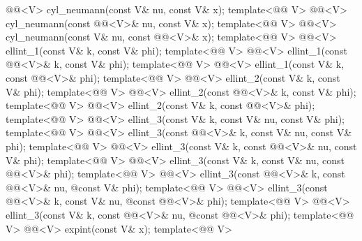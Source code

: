\begin{codeblock}
{    @@<V> cyl_neumann(const V& nu, const V& x);
  template<@@ V>
    @@<V> cyl_neumann(const @@<V>& nu, const V& x);
  template<@@ V>
    @@<V> cyl_neumann(const V& nu, const @@<V>& x);
  template<@@ V>
    @@<V> ellint_1(const V& k, const V& phi);
  template<@@ V>
    @@<V> ellint_1(const @@<V>& k, const V& phi);
  template<@@ V>
    @@<V> ellint_1(const V& k, const @@<V>& phi);
  template<@@ V>
    @@<V> ellint_2(const V& k, const V& phi);
  template<@@ V>
    @@<V> ellint_2(const @@<V>& k, const V& phi);
  template<@@ V>
    @@<V> ellint_2(const V& k, const @@<V>& phi);
  template<@@ V>
    @@<V> ellint_3(const V& k, const V& nu, const V& phi);
  template<@@ V>
    @@<V> ellint_3(const @@<V>& k, const V& nu, const V& phi);
  template<@@ V>
    @@<V> ellint_3(const V& k, const @@<V>& nu, const V& phi);
  template<@@ V>
    @@<V> ellint_3(const V& k, const V& nu, const @@<V>& phi);
  template<@@ V>
    @@<V> ellint_3(const @@<V>& k, const @@<V>& nu,
                             @\itcorr@ const V& phi);
  template<@@ V>
    @@<V> ellint_3(const @@<V>& k, const V& nu,
                             @\itcorr@ const @@<V>& phi);
  template<@@ V>
    @@<V> ellint_3(const V& k, const @@<V>& nu,
                             @\itcorr@ const @@<V>& phi);
  template<@@ V> @@<V> expint(const V& x);
  template<@@ V>
}
\end{codeblock}
